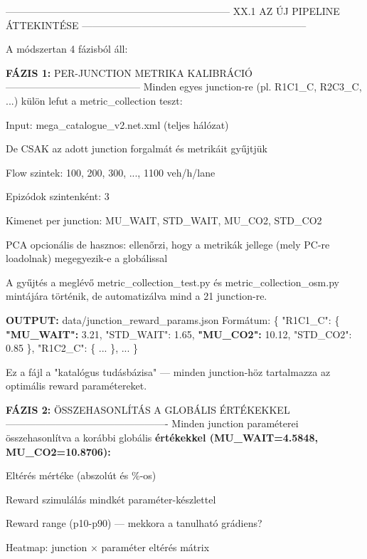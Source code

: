 \documentclass[11pt,a4paper]{article}
\begin{document}
--------------------------------------------------------------------
XX.1 AZ ÚJ PIPELINE ÁTTEKINTÉSE
--------------------------------------------------------------------

A módszertan 4 fázisból áll:

\textbf{FÁZIS 1:} PER-JUNCTION METRIKA KALIBRÁCIÓ
-----------------------------------------
Minden egyes junction-re (pl. R1C1\_C, R2C3\_C, ...) külön lefut
a metric\_collection teszt:
\par\noindent\hspace*{1em}\textbullet{} Input: mega\_catalogue\_v2.net.xml (teljes hálózat)
\par\noindent\hspace*{1em}\textbullet{} De CSAK az adott junction forgalmát és metrikáit gyűjtjük
\par\noindent\hspace*{1em}\textbullet{} Flow szintek: 100, 200, 300, ..., 1100 veh/h/lane
\par\noindent\hspace*{1em}\textbullet{} Epizódok szintenként: 3
\par\noindent\hspace*{1em}\textbullet{} Kimenet per junction: MU\_WAIT, STD\_WAIT, MU\_CO2, STD\_CO2
\par\noindent\hspace*{1em}\textbullet{} PCA opcionális de hasznos: ellenőrzi, hogy a metrikák jellege
(mely PC-re loadolnak) megegyezik-e a globálissal

A gyűjtés a meglévő metric\_collection\_test.py és
metric\_collection\_osm.py mintájára történik, de automatizálva
mind a 21 junction-re.

\textbf{OUTPUT:} data/junction\_reward\_params.json
Formátum:
\{
"R1C1\_C": \{
\textbf{"MU\_WAIT":} 3.21, "STD\_WAIT": 1.65,
\textbf{"MU\_CO2":} 10.12, "STD\_CO2": 0.85
\},
"R1C2\_C": \{ ... \},
...
\}

Ez a fájl a "katalógus tudásbázisa" — minden junction-höz
tartalmazza az optimális reward paramétereket.

\textbf{FÁZIS 2:} ÖSSZEHASONLÍTÁS A GLOBÁLIS ÉRTÉKEKKEL
-------------------------------------------------
Minden junction paraméterei összehasonlítva a korábbi globális
\textbf{értékekkel (MU\_WAIT=4.5848, MU\_CO2=10.8706):}
\par\noindent\hspace*{1em}\textbullet{} Eltérés mértéke (abszolút és \%-os)
\par\noindent\hspace*{1em}\textbullet{} Reward szimulálás mindkét paraméter-készlettel
\par\noindent\hspace*{1em}\textbullet{} Reward range (p10-p90) — mekkora a tanulható grádiens?
\par\noindent\hspace*{1em}\textbullet{} Heatmap: junction × paraméter eltérés mátrix
\end{document}
